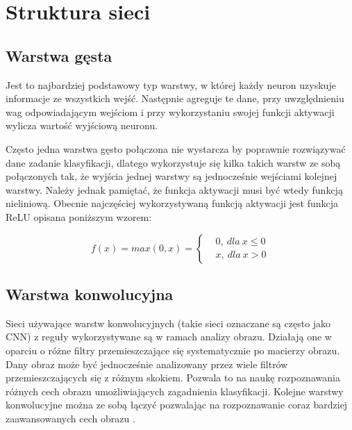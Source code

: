 \newpage %
\section{Struktura sieci}

\subsection{Warstwa gęsta}



Jest to najbardziej podstawowy typ warstwy, w której każdy neuron uzyskuje informacje ze wszystkich wejść. Następnie agreguje te dane, przy uwzględnieniu wag odpowiadającym wejściom i przy wykorzystaniu swojej funkcji aktywacji wylicza wartość wyjściową neuronu\cite{dense_1}. 

Często jedna warstwa gęsto połączona nie wystarcza by poprawnie rozwiązywać dane zadanie klasyfikacji, dlatego wykorzystuje się kilka takich warstw ze sobą połączonych tak, że wyjścia jednej warstwy są jednocześnie wejściami kolejnej warstwy. Należy jednak pamiętać, że funkcja aktywacji musi być wtedy funkcją nieliniową\cite{dense_2}. Obecnie najczęściej wykorzystywaną funkcją aktywacji jest funkcja ReLU opisana poniższym wzorem\cite{acct_func}: 

$$f(x) = max(0,x) = \left\{\begin{matrix}
         & 0,\ dla\ x \leq 0 \\
         & x,\ dla\ x > 0
    \end{matrix}\right.
$$

\subsection{Warstwa konwolucyjna}



Sieci używające warstw konwolucyjnych (takie sieci oznaczane są często jako CNN) z reguły wykorzystywane są w ramach analizy obrazu. Działają one w oparciu o różne filtry przemieszczające się systematycznie po macierzy obrazu. Dany obraz może być jednocześnie analizowany przez wiele filtrów przemieszczających się z różnym skokiem. Pozwala to na naukę rozpoznawania różnych cech obrazu umożliwiających zagadnienia klasyfikacji. Kolejne warstwy konwolucyjne można ze sobą łączyć pozwalając na rozpoznawanie coraz bardziej zaawansowanych cech obrazu\cite{cnn_1} \cite{cnn_2}.

